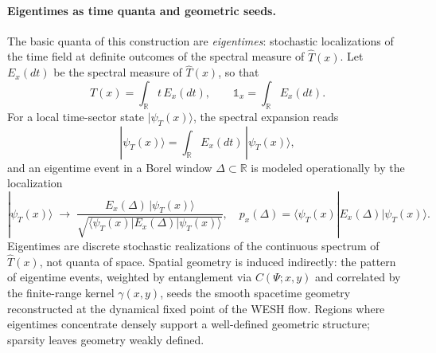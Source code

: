 \documentclass[12pt,a4paper]{article}
\numberwithin{equation}{section}
\begin{document}
\paragraph{Eigentimes as time quanta and geometric seeds.}
The basic quanta of this construction are \emph{eigentimes}: stochastic localizations of the time field at definite outcomes of the spectral measure of $\hat T(x)$. Let $E_x(dt)$ be the spectral measure of $\hat T(x)$, so that
\begin{equation}
\hat T(x) = \int_{\mathbb R} t\,E_x(dt),
\qquad
\mathbb 1_x = \int_{\mathbb R} E_x(dt).
\end{equation}
For a local time-sector state $|\psi_T(x)\rangle$, the spectral expansion reads
\begin{equation}
|\psi_T(x)\rangle = \int_{\mathbb R} E_x(dt)\,|\psi_T(x)\rangle,
\end{equation}
and an eigentime event in a Borel window $\Delta\subset\mathbb R$ is modeled operationally by the localization
\begin{equation}
|\psi_T(x)\rangle \;\longrightarrow\;
\frac{E_x(\Delta)\,|\psi_T(x)\rangle}
{\sqrt{\langle\psi_T(x)|E_x(\Delta)|\psi_T(x)\rangle}},
\quad
p_x(\Delta)=\langle\psi_T(x)|E_x(\Delta)|\psi_T(x)\rangle.
\label{eq:eigentime-collapse}
\end{equation}
Eigentimes are discrete stochastic realizations of the continuous spectrum of $\hat T(x)$, not quanta of space. Spatial geometry is induced indirectly: the pattern of eigentime events, weighted by entanglement via $C(\Psi;x,y)$ and correlated by the finite-range kernel $\gamma(x,y)$, seeds the smooth spacetime geometry reconstructed at the dynamical fixed point of the WESH flow. Regions where eigentimes concentrate densely support a well-defined geometric structure; sparsity leaves geometry weakly defined.
\end{document}
